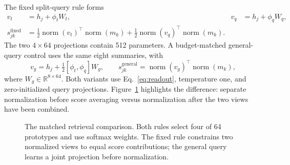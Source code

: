 \documentclass[runningheads]{llncs}
\providecommand{\Description}[1]{}
\newcommand{\Nrm}{\operatorname{norm}}
\begin{document}
The fixed split-query rule forms
\begin{align}
 v_t&=h_j+\phi_t W_t, & v_q&=h_j+\phi_q W_q,\\
 s^{\mathrm{fixed}}_{jk}
 &=\tfrac12\Nrm(v_t)^\top\Nrm(m_k)
   +\tfrac12\Nrm(v_q)^\top\Nrm(m_k).
 \label{eq:fixed}
\end{align}
The two $4\times64$ projections contain 512 parameters. A budget-matched general-query control uses the same eight summaries, with
\begin{equation}
 v_g=h_j+\tfrac12[\phi_t,\phi_q]W_g,\qquad
 s^{\mathrm{general}}_{jk}=\Nrm(v_g)^\top\Nrm(m_k),
 \label{eq:generic}
\end{equation}
where $W_g\in\mathbb{R}^{8\times64}$. Both variants use Eq.~\eqref{eq:readout}, temperature one, and zero-initialized query projections. Figure~\ref{fig:retrieval} highlights the difference: separate normalization before score averaging versus normalization after the two views have been combined.

\begin{figure}[t]
\centering
{}
\caption{The matched retrieval comparison. Both rules select four of 64 prototypes and use softmax weights. The fixed rule constrains two normalized views to equal score contributions; the general query learns a joint projection before normalization.}
\label{fig:retrieval}
\Description{Separate normalized time and quantity queries compared with a joint normalized query, each with 512 additional parameters.}
\end{figure}
\end{document}
